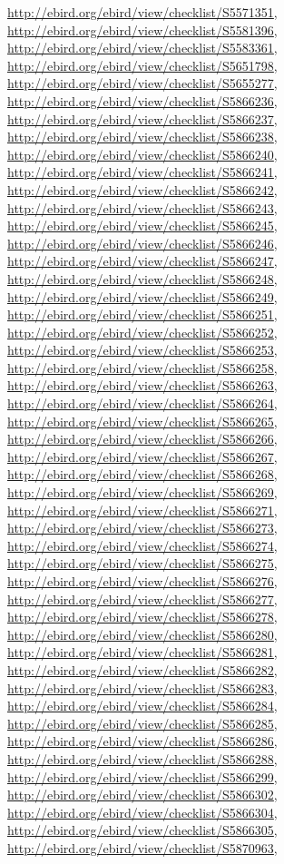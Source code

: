 \documentclass[9pt, article]{memoir}
\begin{document}
\begin{multicols}{2}
\url{http://ebird.org/ebird/view/checklist/S5571351}, 
\url{http://ebird.org/ebird/view/checklist/S5581396}, 
\url{http://ebird.org/ebird/view/checklist/S5583361}, 
\url{http://ebird.org/ebird/view/checklist/S5651798}, 
\url{http://ebird.org/ebird/view/checklist/S5655277}, 
\url{http://ebird.org/ebird/view/checklist/S5866236}, 
\url{http://ebird.org/ebird/view/checklist/S5866237}, 
\url{http://ebird.org/ebird/view/checklist/S5866238}, 
\url{http://ebird.org/ebird/view/checklist/S5866240}, 
\url{http://ebird.org/ebird/view/checklist/S5866241}, 
\url{http://ebird.org/ebird/view/checklist/S5866242}, 
\url{http://ebird.org/ebird/view/checklist/S5866243}, 
\url{http://ebird.org/ebird/view/checklist/S5866245}, 
\url{http://ebird.org/ebird/view/checklist/S5866246}, 
\url{http://ebird.org/ebird/view/checklist/S5866247}, 
\url{http://ebird.org/ebird/view/checklist/S5866248}, 
\url{http://ebird.org/ebird/view/checklist/S5866249}, 
\url{http://ebird.org/ebird/view/checklist/S5866251}, 
\url{http://ebird.org/ebird/view/checklist/S5866252}, 
\url{http://ebird.org/ebird/view/checklist/S5866253}, 
\url{http://ebird.org/ebird/view/checklist/S5866258}, 
\url{http://ebird.org/ebird/view/checklist/S5866263}, 
\url{http://ebird.org/ebird/view/checklist/S5866264}, 
\url{http://ebird.org/ebird/view/checklist/S5866265}, 
\url{http://ebird.org/ebird/view/checklist/S5866266}, 
\url{http://ebird.org/ebird/view/checklist/S5866267}, 
\url{http://ebird.org/ebird/view/checklist/S5866268}, 
\url{http://ebird.org/ebird/view/checklist/S5866269}, 
\url{http://ebird.org/ebird/view/checklist/S5866271}, 
\url{http://ebird.org/ebird/view/checklist/S5866273}, 
\url{http://ebird.org/ebird/view/checklist/S5866274}, 
\url{http://ebird.org/ebird/view/checklist/S5866275}, 
\url{http://ebird.org/ebird/view/checklist/S5866276}, 
\url{http://ebird.org/ebird/view/checklist/S5866277}, 
\url{http://ebird.org/ebird/view/checklist/S5866278}, 
\url{http://ebird.org/ebird/view/checklist/S5866280}, 
\url{http://ebird.org/ebird/view/checklist/S5866281}, 
\url{http://ebird.org/ebird/view/checklist/S5866282}, 
\url{http://ebird.org/ebird/view/checklist/S5866283}, 
\url{http://ebird.org/ebird/view/checklist/S5866284}, 
\url{http://ebird.org/ebird/view/checklist/S5866285}, 
\url{http://ebird.org/ebird/view/checklist/S5866286}, 
\url{http://ebird.org/ebird/view/checklist/S5866288}, 
\url{http://ebird.org/ebird/view/checklist/S5866299}, 
\url{http://ebird.org/ebird/view/checklist/S5866302}, 
\url{http://ebird.org/ebird/view/checklist/S5866304}, 
\url{http://ebird.org/ebird/view/checklist/S5866305}, 
\url{http://ebird.org/ebird/view/checklist/S5870963}, 

\end{multicols}
\end{document}
